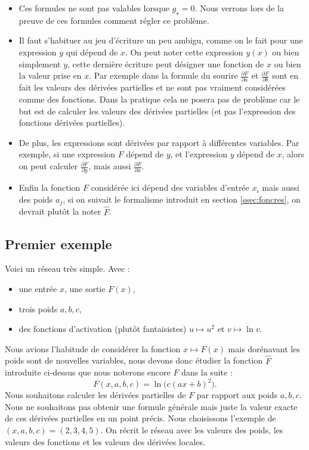 \begin{itemize}
	\item Ces formules ne sont pas valables lorsque $g_\star=0$. Nous verrons lors de la preuve de ces formules comment régler ce problème.
	
	\item Il faut s'habituer au jeu d'écriture un peu ambigu, comme on le fait pour une expression $y$ qui dépend de $x$. On peut noter cette expression $y(x)$ ou bien simplement $y$, cette dernière écriture peut désigner une fonction de $x$ ou bien la valeur prise en $x$. Par exemple dans la formule du sourire  $\frac{\partial F}{\partial a}$ et $ \frac{\partial F}{\partial b}$ sont en fait les valeurs des dérivées partielles et ne sont pas vraiment considérées comme des fonctions. Dans la pratique cela ne posera pas de problème car le but est de calculer les valeurs des dérivées partielles (et pas l'expression des fonctions dérivées partielles).
	
	\item De plus, les expressions sont dérivées par rapport à différentes variables. Par exemple, si une expression $F$ dépend de $y$, et l'expression $y$ dépend de $x$, alors on peut calculer  $\frac{\partial F}{\partial y}$, mais aussi $\frac{\partial F}{\partial x}$. 
	
	\item Enfin la fonction $F$ considérée ici dépend des variables d'entrée $x_i$ mais aussi des poids $a_j$, si on suivait le formalisme introduit en section \ref{ssec:foncres}, on devrait plutôt la noter  $\widehat F$.
\end{itemize}


\subsection{Premier exemple}

Voici un réseau très simple.
Avec :
\begin{itemize}
	\item une entrée $x$, une sortie $F(x)$,
	\item trois poids $a,b,c$,
	\item des fonctions d'activation (plutôt fantaisistes) $u \mapsto u^2$ et $v \mapsto \ln v$.
\end{itemize}
Nous avions l'habitude de considérer la fonction $x \mapsto F(x)$ mais dorénavant les poids sont de nouvelles variables, nous devons donc étudier la fonction 
$\widehat F$ introduite ci-dessus que nous noterons encore $F$ dans la suite :
$$F(x,a,b,c) = \ln\big( c (ax+b)^2 \big).$$
Nous souhaitons calculer les dérivées partielles de $F$ par rapport aux poids $a,b,c$. Nous ne souhaitons pas obtenir une formule générale mais juste la valeur exacte de ces dérivées partielles en un point précis. Nous choisissons l'exemple de 
$(x,a,b,c) = (2,3,4,5)$.
On récrit le réseau avec les valeurs des poids, les valeurs des fonctions et les valeurs des dérivées locales.


